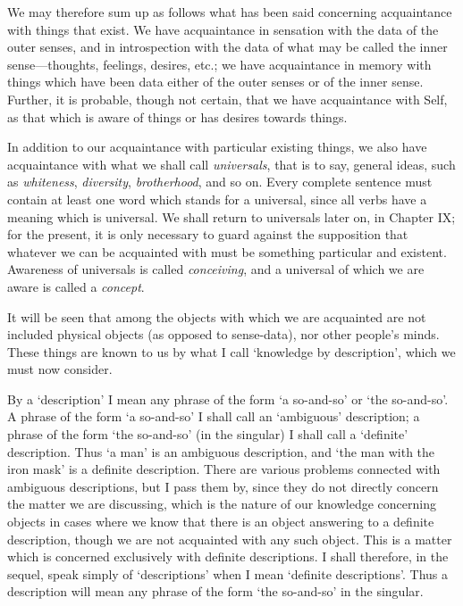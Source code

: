 \documentclass[oneside,letterpaper,12pt]{book}
\begin{document}
\label{acquaintance} We may therefore sum up as follows what has been said concerning
acquaintance with things that exist. We have acquaintance in sensation
with the data of the outer senses, and in introspection with the data of
what may be called the inner sense---thoughts, feelings, desires, etc.;
we have acquaintance in memory with things which have been data either
of the outer senses or of the inner sense. Further, it is probable,
though not certain, that we have acquaintance with Self, as that which
is aware of things or has desires towards things.

In addition to our acquaintance with particular existing things, we also
have acquaintance with what we shall call \emph{universals}, that is to
say, general ideas, such as \emph{whiteness}, \emph{diversity},
\emph{brotherhood}, and so on. Every complete sentence must contain at
least one word which stands for a universal, since all verbs have a
meaning which is universal. We shall return to universals later on, in
Chapter IX; for the present, it is only necessary to guard against the
supposition that whatever we can be acquainted with must be something
particular and existent. Awareness of universals is called
\emph{conceiving}, and a universal of which we are aware is called a
\emph{concept}.

It will be seen that among the objects with which we are acquainted are
not included physical objects (as opposed to sense-data), nor other
people's minds. These things are known to us by what I
call `knowledge by description', which we
must now consider.

By a `description' I mean any phrase of
the form `a so-and-so' or
`the so-and-so'. A phrase of the form
`a so-and-so' I shall call an
`ambiguous' description; a phrase of
the form `the so-and-so' (in the
singular) I shall call a `definite'
description. Thus `a man' is an
ambiguous description, and `the man with the iron
mask' is a definite description. There are various
problems connected with ambiguous descriptions, but I pass them by,
since they do not directly concern the matter we are discussing, which
is the nature of our knowledge concerning objects in cases where we know
that there is an object answering to a definite description, though we
are not acquainted with any such object. This is a matter which is
concerned exclusively with definite descriptions. I shall therefore, in
the sequel, speak simply of
`descriptions' when I mean
`definite descriptions'. Thus a
description will mean any phrase of the form `the
so-and-so' in the singular.
\end{document}
